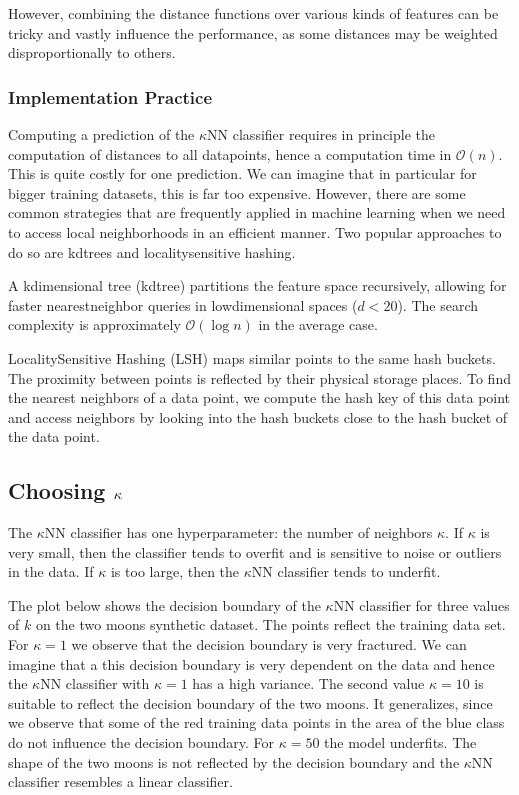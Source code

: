 \documentclass[letterpaper,10pt,english]{jupyterBook}
\begin{document}
\sphinxAtStartPar
However, combining the distance functions over various kinds of features can be tricky and vastly influence the performance, as some distances may be weighted disproportionally to others.


\subsubsection{Implementation Practice}
\label{\detokenize{classification_knn:implementation-practice}}
\sphinxAtStartPar
Computing a prediction of the \(\kappa\)NN classifier requires in principle the computation of distances to all datapoints, hence a computation time in \(\mathcal{O}(n)\). This is quite costly for one prediction. We can imagine that in particular for bigger training datasets, this is far too expensive. However, there are some common strategies that are frequently applied in machine learning when we need to access local neighborhoods in an efficient manner. Two popular approaches to do so are kd\sphinxhyphen{}trees and locality\sphinxhyphen{}sensitive hashing.

\sphinxAtStartPar
A k\sphinxhyphen{}dimensional tree (kd\sphinxhyphen{}tree) partitions the feature space recursively, allowing for faster nearest\sphinxhyphen{}neighbor queries in low\sphinxhyphen{}dimensional spaces (\(d<20\)). The search complexity is approximately \(\mathcal{O}(\log ⁡n)\) in the average case.

\sphinxAtStartPar
Locality\sphinxhyphen{}Sensitive Hashing (LSH) maps similar points to the same hash buckets. The proximity between points is reflected by their physical storage places. To find the nearest neighbors of a data point, we compute the hash key of this data point and access neighbors by looking into the hash buckets close to the hash bucket of the data point.


\subsection{Choosing \protect\(\kappa\protect\)}
\label{\detokenize{classification_knn:choosing-kappa}}
\sphinxAtStartPar
The \(\kappa\)NN classifier has one hyperparameter: the number of neighbors \(\kappa\). If \(\kappa\) is very small, then the classifier tends to overfit and is sensitive to noise or outliers in the data. If \(\kappa\) is too large, then the \(\kappa\)NN classifier tends to underfit.

\sphinxAtStartPar
The plot below shows the decision boundary of the \(\kappa\)NN classifier for three values of \(k\) on the two moons synthetic dataset. The points reflect the training data set. For \(\kappa=1\) we observe that the decision boundary is very fractured. We can imagine that a this decision boundary is very dependent on the data and hence the \(\kappa\)NN classifier with \(\kappa=1\) has a high variance. The second value \(\kappa=10\) is suitable to reflect the decision boundary of the two moons. It generalizes, since we observe that some of the red training data points in the area of the blue class do not influence the decision boundary. For \(\kappa=50\) the model underfits. The shape of the two moons is not reflected by the decision boundary and the \(\kappa\)NN classifier resembles a linear classifier.
\end{document}
